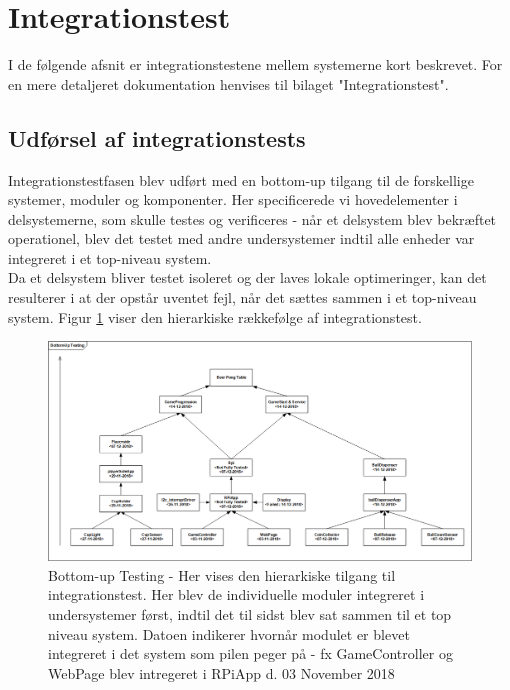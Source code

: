 \documentclass[Rapport/Rapport_main.tex]{subfiles}
\begin{document}
\section{Integrationstest}\label{sec:rap_integrationstest}
I de følgende afsnit er integrationstestene mellem systemerne kort beskrevet. For en mere detaljeret dokumentation henvises til bilaget "Integrationstest". 

\subsection{Udførsel af integrationstests}
Integrationstestfasen blev udført med en bottom-up tilgang til de forskellige systemer, moduler og komponenter. Her specificerede vi hovedelementer i delsystemerne, som skulle testes og verificeres - når et delsystem blev bekræftet operationel, blev det testet med andre undersystemer indtil alle enheder var integreret i et top-niveau system. \\
Da et delsystem bliver testet isoleret og der laves lokale optimeringer, kan det resulterer i at der opstår uventet fejl, når det sættes sammen i et top-niveau system. Figur \ref{fig:Bottom-Up} viser den hierarkiske rækkefølge af integrationstest. 
\begin{figure}[H]
    \centering
    \includegraphics[width=1\textwidth]{Rapport/Test/graphics/Buttom-Up.png}
    \caption{Bottom-up Testing - Her vises den hierarkiske tilgang til integrationstest. Her blev de individuelle moduler integreret i undersystemer først, indtil det til sidst blev sat sammen til et top niveau system. Datoen indikerer hvornår modulet er blevet integreret i det system som pilen peger på - fx GameController og WebPage blev intregeret i RPiApp d. 03 November 2018}
   \label{fig:Bottom-Up}
\end{figure}
\end{document}
